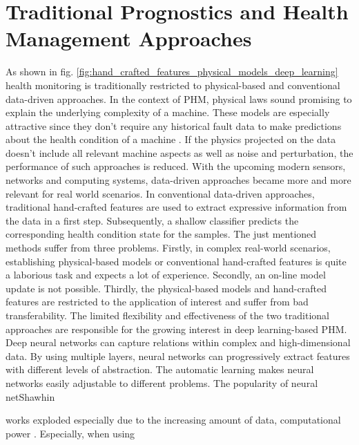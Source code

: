\section{Traditional Prognostics and Health Management Approaches}
As shown in fig. \ref{fig:hand_crafted_features_physical_models_deep_learning} health monitoring is traditionally restricted to physical-based and conventional data-driven approaches. In the context of PHM, physical laws sound promising to explain the underlying complexity of a machine. These models are especially attractive since they don't require any historical fault data to make predictions about the health condition of a machine \cite{AN201942}. If the physics projected on the data doesn't include all relevant machine aspects as well as noise and perturbation, the performance of such approaches is reduced. With the upcoming modern sensors, networks and computing systems, data-driven approaches became more and more relevant for real world scenarios. In conventional data-driven approaches, traditional hand-crafted features are used to extract expressive information from the data in a first step. Subsequently, a shallow classifier predicts the corresponding health condition state for the samples. The just mentioned methods suffer from three problems. Firstly, in complex real-world scenarios, establishing physical-based models or conventional hand-crafted features is quite a laborious task and expects a lot of experience. Secondly, an on-line model update is not possible. Thirdly, the physical-based models and hand-crafted features are restricted to the application of interest and suffer from bad transferability. The limited flexibility and effectiveness of the two traditional approaches are responsible for the growing interest in deep learning-based PHM. Deep neural networks can capture relations within complex and high-dimensional data. By using multiple layers, neural networks can progressively extract features with different levels of abstraction. The automatic learning makes neural networks easily adjustable to different problems. The popularity of neural netShawhin

works exploded especially due to the increasing amount of data, computational power \cite{ZHAO2019213} \cite{AZAMFAR2020103932}. Especially, when using 

